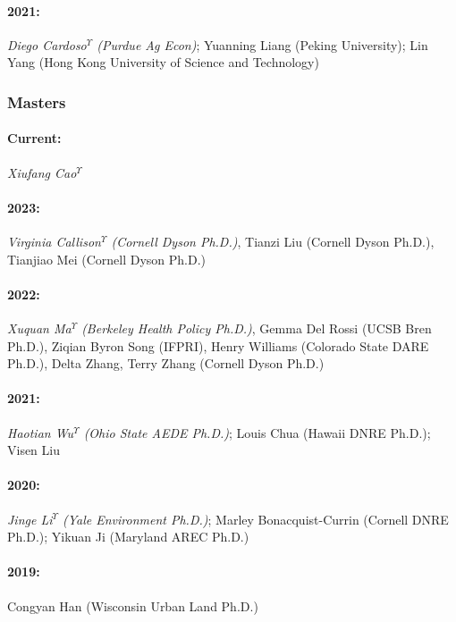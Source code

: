 \documentclass[11pt]{res} %
\begin{document}
\begin{resume}
\paragraph{2021:} \textit{Diego Cardoso$^\Upsilon$ (Purdue Ag Econ)}; Yuanning Liang (Peking University); Lin Yang (Hong Kong University of Science and Technology)

\vspace{-.2in}
 
\subsubsection{Masters}\vspace{-.2in}
\paragraph{Current:} \textit{Xiufang Cao}$^\Upsilon$
\vspace{-.35in} 
\paragraph{2023:} \textit{Virginia Callison$^\Upsilon$ (Cornell Dyson Ph.D.)}, Tianzi Liu (Cornell Dyson Ph.D.), Tianjiao Mei (Cornell Dyson Ph.D.)
\vspace{-.35in} 
\paragraph{2022:} \textit{Xuquan Ma$^\Upsilon$ (Berkeley Health Policy Ph.D.)}, Gemma Del Rossi (UCSB Bren Ph.D.), Ziqian Byron Song (IFPRI), Henry Williams (Colorado State DARE Ph.D.), Delta Zhang, Terry Zhang (Cornell Dyson Ph.D.)
\vspace{-.35in}
\paragraph{2021:} \textit{Haotian Wu$^\Upsilon$ (Ohio State AEDE Ph.D.)}; Louis Chua (Hawaii DNRE Ph.D.); Visen Liu
\vspace{-.35in}
\paragraph{2020:} \textit{Jinge Li$^\Upsilon$ (Yale Environment Ph.D.)}; Marley Bonacquist-Currin (Cornell DNRE Ph.D.); Yikuan Ji (Maryland AREC Ph.D.)
\vspace{-.35in}
\paragraph{2019:} Congyan Han (Wisconsin Urban Land Ph.D.)


\end{resume}
\end{document}
